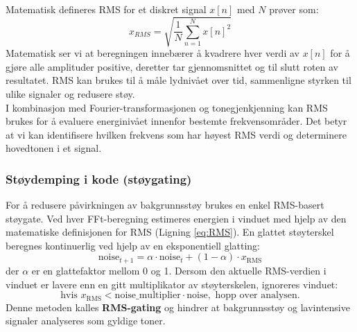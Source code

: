 Matematisk defineres RMS for et diskret signal $x[n]$ med $N$ prøver som:
\begin{equation}
    x_{RMS} = \sqrt{\frac{1}{N} \sum_{n=1}^{N} x[n]^2}
    \label{eq:RMS}
\end{equation}
\noindent
Matematisk ser vi at beregningen innebærer å kvadrere hver verdi av $x[n]$ for å gjøre alle amplituder positive, deretter tar gjennomsnittet og til slutt roten av resultatet. RMS kan brukes til å måle lydnivået over tid, sammenligne styrken til ulike signaler og redusere støy. \\
I kombinasjon med Fourier-transformasjonen og tonegjenkjenning kan RMS brukes for å evaluere energinivået innenfor bestemte frekvensområder. Det betyr at vi kan identifisere hvilken frekvens som har høyest RMS verdi og determinere hovedtonen i et signal.

\subsubsection{Støydemping i kode (støygating)}
For å redusere påvirkningen av bakgrunnsstøy brukes en enkel RMS-basert støygate. Ved hver FFt-beregning estimeres energien i vinduet med hjelp av den matematiske definisjonen for RMS (Ligning \ref{eq:RMS}). En glattet støyterskel beregnes kontinuerlig ved hjelp av en eksponentiell glatting:
\[
\text{noise}_{t+1} = \alpha \cdot \text{noise}_t + (1 - \alpha) \cdot x_{\text{RMS}}
\]
der $\alpha$ er en glattefaktor mellom 0 og 1. 
Dersom den aktuelle RMS-verdien i vinduet er lavere enn en gitt multiplikator av støyterskelen, ignoreres vinduet:
\[
\text{hvis } x_{\text{RMS}} < \text{noise\_multiplier} \cdot \text{noise}, \text{ hopp over analysen.}
\]
Denne metoden kalles \textbf{RMS-gating} og hindrer at bakgrunnsstøy og lavintensive signaler analyseres som gyldige toner.
